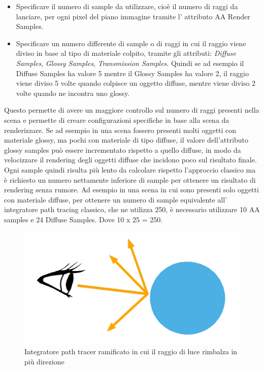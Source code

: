 \begin{itemize}
\item Specificare il numero di sample da utilizzare, cioè il numero di raggi da lanciare, per ogni pixel del piano immagine tramite l’ attributo AA Render Samples.
\item Specificare un numero differente di sample o di raggi in cui il raggio viene diviso in base al tipo di materiale colpito, tramite gli attributi: \emph{Diffuse Samples}, \emph{Glossy Samples}, \emph{Transmission Samples}. Quindi se ad esempio il Diffuse Samples ha valore 5 mentre il Glossy Samples ha valore 2, il raggio viene diviso 5 volte quando colpisce un oggetto diffuse, mentre viene diviso 2 volte quando ne incontra uno glossy.
\end{itemize}
Questo permette di avere un maggiore controllo sul numero di raggi presenti nella scena e permette di creare configurazioni specifiche in base alla scena da renderizzare.
Se ad esempio in una scena fossero presenti molti oggetti con materiale glossy, ma pochi con materiale di tipo diffuse, il valore dell’attributo glossy samples può essere incrementato rispetto a quello diffuse, in modo da velocizzare il rendering degli oggetti diffuse che incidono poco sul risultato finale.
\\
Ogni sample quindi risulta più lento da calcolare rispetto l’approccio classico ma è richiesto un numero nettamente inferiore di sample per ottenere un risultato di rendering senza rumore.
Ad esempio in una scena in cui sono presenti solo oggetti con materiale diffuse, per ottenere un numero di sample equivalente all’ integratore path tracing classico, che ne utilizza 250, è necessario utilizzare 10 AA samples e 24 Diffuse Samples. Dove 10 x 25 = 250.
\begin{figure}[htb]
 \centering
 \includegraphics[width=0.6\linewidth]{images/chapter_tecnologie_abilitanti/tecnologie_abilitanti_sferaluce2.jpg}\hfill
 \caption[Integratore path tracer ramificato]{Integratore path tracer ramificato in cui il raggio di luce rimbalza in più direzione}
 \label{fig:tecnologie_abilitanti_sferaluce2}
\end{figure}
